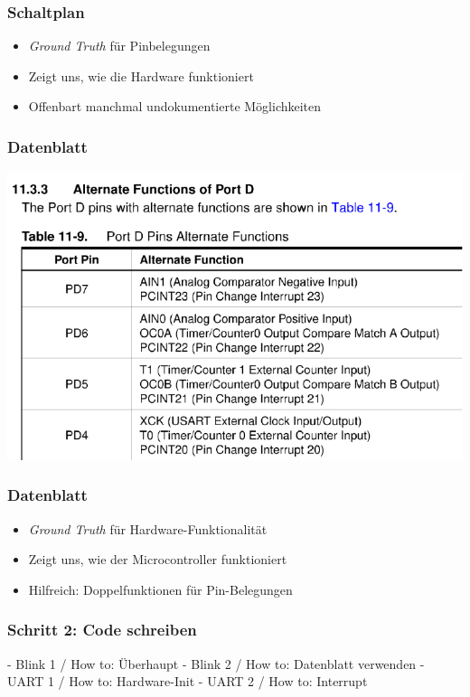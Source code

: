 \documentclass{beamer}
\begin{document}

\begin{frame}
\frametitle{Schaltplan}
\begin{itemize}
\item \textit{Ground Truth} für Pinbelegungen
\item Zeigt uns, wie die Hardware funktioniert
\item Offenbart manchmal undokumentierte Möglichkeiten
\end{itemize}


\end{frame}



\begin{frame}
\frametitle{Datenblatt}
\includegraphics{datasheet.pdf}
\end{frame}

\begin{frame}
\frametitle{Datenblatt}
\begin{itemize}
\item \textit{Ground Truth} für Hardware-Funktionalität
\item Zeigt uns, wie der Microcontroller funktioniert
\item Hilfreich: Doppelfunktionen für Pin-Belegungen
\end{itemize}

\end{frame}

\begin{frame}
\frametitle{Schritt 2: Code schreiben}
    - Blink 1 / How to: Überhaupt
    - Blink 2 / How to: Datenblatt verwenden
    - UART 1 / How to: Hardware-Init
    - UART 2 / How to: Interrupt
\end{frame}
\end{document}
